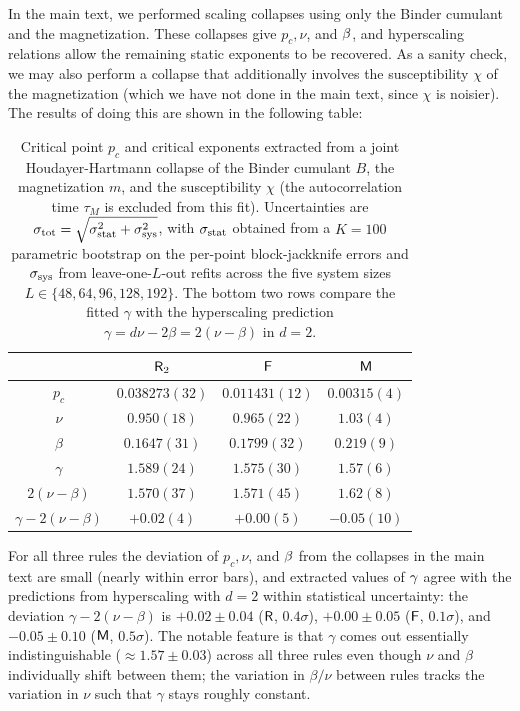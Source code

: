 \documentclass[pra,aps,twocolumn,groupedaddress,superscriptaddress,nofootinbib,preprintnumbers]{revtex4-2}
\begin{document}
\begin{widetext}
		In the main text, we performed scaling collapses using only the Binder cumulant and the  magnetization. These collapses give $p_c,\nu$, and $\beta$, and hyperscaling relations allow the remaining static exponents to be recovered. As a sanity check, we may also perform a collapse that additionally involves the susceptibility $\chi$ of the magnetization (which we have not done in the main text, since $\chi$ is noisier). The results of doing this are shown in the following table: 		
		\begin{table}[h]
			\centering
			\renewcommand{\arraystretch}{1.3}
			\begin{tabular}{c|ccc}
				& $\mathsf{R}_2$ & $\mathsf{F}$ & $\mathsf{M}$ \\ \hline
				$p_c$       & $0.038273(32)$ & $0.011431(12)$ & $0.00315(4)$ \\
				$\nu$       & $0.950(18)$    & $0.965(22)$    & $1.03(4)$    \\
				$\beta$     & $0.1647(31)$   & $0.1799(32)$   & $0.219(9)$   \\
				$\gamma$    & $1.589(24)$    & $1.575(30)$    & $1.57(6)$    \\ \hline
				$2(\nu-\beta)$ & $1.570(37)$ & $1.571(45)$    & $1.62(8)$    \\
				$\gamma - 2(\nu-\beta)$ & $+0.02(4)$ & $+0.00(5)$ & $-0.05(10)$ \\
			\end{tabular}
			\caption{Critical point $p_c$ and critical exponents extracted from a joint Houdayer-Hartmann collapse of the Binder cumulant $B$, the magnetization $m$, and the susceptibility $\chi$ (the autocorrelation time $\tau_M$ is excluded from this fit). Uncertainties are $\sigma_{\rm tot}=\sqrt{\sigma_{\rm stat}^2+\sigma_{\rm sys}^2}$, with $\sigma_{\rm stat}$ obtained from a $K=100$ parametric bootstrap on the per-point block-jackknife errors and $\sigma_{\rm sys}$ from leave-one-$L$-out refits across the five system sizes $L\in\{48,64,96,128,192\}$. The bottom two rows compare the fitted $\gamma$ with the hyperscaling prediction $\gamma = d\nu - 2\beta = 2(\nu - \beta)$ in $d=2$.}
			\label{tab:four-param-exponents}
		\end{table}
		
		For all three rules the deviation of $p_c,\nu$, and $\beta$ from the collapses in the main text are small (nearly within error bars), and extracted values of $\gamma$ agree with the predictions from hyperscaling with $d=2$ within statistical uncertainty: the deviation $\gamma - 2(\nu-\beta)$ is $+0.02 \pm 0.04$ ($\mathsf{R}$, $0.4\sigma$), $+0.00 \pm 0.05$ ($\mathsf{F}$, $0.1\sigma$), and $-0.05 \pm 0.10$ ($\mathsf{M}$, $0.5\sigma$). The notable feature is that $\gamma$ comes out essentially indistinguishable ($\approx 1.57 \pm 0.03$) across all three rules even though $\nu$ and $\beta$ individually shift between them; the variation in $\beta/\nu$ between rules tracks the variation in $\nu$ such that $\gamma$ stays roughly constant. 
		

\end{widetext}
\end{document}

